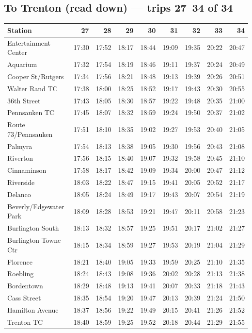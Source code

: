 \subsection*{To Trenton (read down) --- trips 27--34 of 34}
\begin{center}\footnotesize\setlength{\tabcolsep}{3pt}\begin{tabular}{@{}lrrrrrrrr@{}}\toprule
Station & 27 & 28 & 29 & 30 & 31 & 32 & 33 & 34 \\\midrule
Entertainment Center & 17:30 & 17:52 & 18:17 & 18:44 & 19:09 & 19:35 & 20:22 & 20:47 \\
Aquarium & 17:32 & 17:54 & 18:19 & 18:46 & 19:11 & 19:37 & 20:24 & 20:49 \\
Cooper St/Rutgers & 17:34 & 17:56 & 18:21 & 18:48 & 19:13 & 19:39 & 20:26 & 20:51 \\
Walter Rand TC & 17:38 & 18:00 & 18:25 & 18:52 & 19:17 & 19:43 & 20:30 & 20:55 \\
36th Street & 17:43 & 18:05 & 18:30 & 18:57 & 19:22 & 19:48 & 20:35 & 21:00 \\
Pennsauken TC & 17:45 & 18:07 & 18:32 & 18:59 & 19:24 & 19:50 & 20:37 & 21:02 \\
Route 73/Pennsauken & 17:51 & 18:10 & 18:35 & 19:02 & 19:27 & 19:53 & 20:40 & 21:05 \\
Palmyra & 17:54 & 18:13 & 18:38 & 19:05 & 19:30 & 19:56 & 20:43 & 21:08 \\
Riverton & 17:56 & 18:15 & 18:40 & 19:07 & 19:32 & 19:58 & 20:45 & 21:10 \\
Cinnaminson & 17:58 & 18:17 & 18:42 & 19:09 & 19:34 & 20:00 & 20:47 & 21:12 \\
Riverside & 18:03 & 18:22 & 18:47 & 19:15 & 19:41 & 20:05 & 20:52 & 21:17 \\
Delanco & 18:05 & 18:24 & 18:49 & 19:17 & 19:43 & 20:07 & 20:54 & 21:19 \\
Beverly/Edgewater Park & 18:09 & 18:28 & 18:53 & 19:21 & 19:47 & 20:11 & 20:58 & 21:23 \\
Burlington South & 18:13 & 18:32 & 18:57 & 19:25 & 19:51 & 20:17 & 21:02 & 21:27 \\
Burlington Towne Ctr & 18:15 & 18:34 & 18:59 & 19:27 & 19:53 & 20:19 & 21:04 & 21:29 \\
Florence & 18:21 & 18:40 & 19:05 & 19:33 & 19:59 & 20:25 & 21:10 & 21:35 \\
Roebling & 18:24 & 18:43 & 19:08 & 19:36 & 20:02 & 20:28 & 21:13 & 21:38 \\
Bordentown & 18:29 & 18:48 & 19:13 & 19:41 & 20:07 & 20:33 & 21:18 & 21:43 \\
Cass Street & 18:35 & 18:54 & 19:20 & 19:47 & 20:13 & 20:39 & 21:24 & 21:50 \\
Hamilton Avenue & 18:37 & 18:56 & 19:22 & 19:49 & 20:15 & 20:41 & 21:26 & 21:52 \\
Trenton TC & 18:40 & 18:59 & 19:25 & 19:52 & 20:18 & 20:44 & 21:29 & 21:55 \\
\bottomrule\end{tabular}\end{center}
